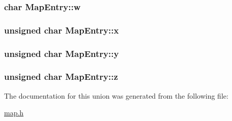 \subsubsection[{\texorpdfstring{w}{w}}]{\setlength{\rightskip}{0pt plus 5cm}char Map\+Entry\+::w}\hypertarget{unionMapEntry_a95795e5a3f7c18129e5839d26b8b7167}{}\label{unionMapEntry_a95795e5a3f7c18129e5839d26b8b7167}
\subsubsection[{\texorpdfstring{x}{x}}]{\setlength{\rightskip}{0pt plus 5cm}unsigned char Map\+Entry\+::x}\hypertarget{unionMapEntry_a2ce48990b14ea63b8b166c044a845902}{}\label{unionMapEntry_a2ce48990b14ea63b8b166c044a845902}
\subsubsection[{\texorpdfstring{y}{y}}]{\setlength{\rightskip}{0pt plus 5cm}unsigned char Map\+Entry\+::y}\hypertarget{unionMapEntry_a3cb395be05afd1381c3f5d862a2218d3}{}\label{unionMapEntry_a3cb395be05afd1381c3f5d862a2218d3}
\subsubsection[{\texorpdfstring{z}{z}}]{\setlength{\rightskip}{0pt plus 5cm}unsigned char Map\+Entry\+::z}\hypertarget{unionMapEntry_aeebe1190e2585cd8bbdd32b3faf590cd}{}\label{unionMapEntry_aeebe1190e2585cd8bbdd32b3faf590cd}


The documentation for this union was generated from the following file\+:\begin{DoxyCompactItemize}
\item 
\hyperlink{map_8h}{map.\+h}\end{DoxyCompactItemize}

